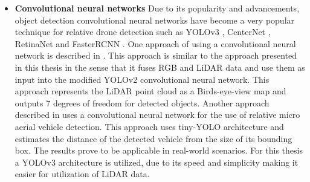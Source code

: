 \documentclass[twoside]{ctuthesis}
\theoremstyle{plain}
\theoremstyle{definition}
\theoremstyle{note}
\begin{document}
\begin{itemize}
	\item \textbf{Convolutional neural networks} Due to its popularity and advancements, object detection convolutional neural networks have become a very popular technique for relative drone detection such as YOLOv3 \cite{redmon2018yolov3}, CenterNet \cite{zhou2019objects}, RetinaNet \cite{lin2018focal} and FasterRCNN \cite{ren2016faster}. One approach of using a convolutional neural network is described in \cite{ali2018yolo3d}. This approach is similar to the approach presented in this thesis in the sense that it fuses RGB and LiDAR data and use them as input into the modified YOLOv2 \cite{redmon2016yolo9000} convolutional neural network. This approach represents the LiDAR point cloud as a Birds-eye-view map and outputs 7 degrees of freedom for detected objects. Another approach described in \cite{8988144} uses a convolutional neural network for the use of relative micro aerial vehicle detection. This approach uses tiny-YOLO architecture \cite{redmon2016yolo9000} and estimates the distance of the detected vehicle from the size of its bounding box. The results prove to be applicable in real-world scenarios. For this thesis a YOLOv3 architecture is utilized, due to its speed and simplicity making it easier for utilization of LiDAR data.
\end{itemize}
\end{document}
